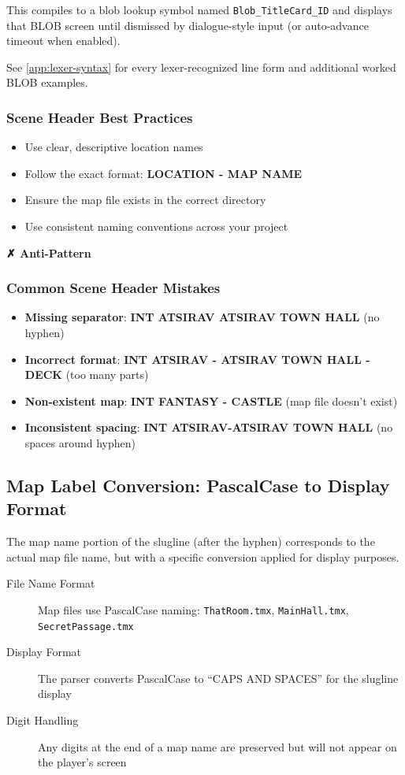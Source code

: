 \documentclass[11pt,letterpaper,oldstylefigures]{memoir}
\newenvironment{AntiPattern}
{\begingroup
\small
\setlength{\parindent}{0pt}
\setlength{\parskip}{0.5em}
\allowdisplaybreaks
\setlength{\displaywidowpenalty}{0}
\setlength{\widowpenalty}{0}
\setlength{\clubpenalty}{0}
\setlength{\interlinepenalty}{0}
\begin{tcolorbox}[
    colback=red!5,
    colframe=red!75!black,
    boxrule=0.5pt,
    arc=2pt,
    left=0.5em,
    right=0.5em,
    top=0.25em,
    bottom=0.25em
]
\textbf{✗ Anti-Pattern}
\end{tcolorbox}\par
}
{\endgroup}
\newcommand{\fountain}[1]{\textbf{#1}}
\begin{document}
This compiles to a blob lookup symbol named \texttt{Blob\_TitleCard\_ID} and displays that BLOB screen until dismissed by dialogue-style input (or auto-advance timeout when enabled).

\noindent See \autoref{app:lexer-syntax} for every lexer-recognized line form and additional worked BLOB examples.

\subsubsection{Scene Header Best Practices}
\begin{itemize}
\item Use clear, descriptive location names
\item Follow the exact format: \fountain{LOCATION - MAP NAME}
\item Ensure the map file exists in the correct directory
\item Use consistent naming conventions across your project
\end{itemize}


\begin{AntiPattern}
\subsubsection{Common Scene Header Mistakes}
\begin{itemize}
\item \textbf{Missing separator}: \fountain{INT ATSIRAV ATSIRAV TOWN HALL} (no hyphen)
\item \textbf{Incorrect format}: \fountain{INT ATSIRAV - ATSIRAV TOWN HALL - DECK} (too many parts)
\item \textbf{Non-existent map}: \fountain{INT FANTASY - CASTLE} (map file doesn't exist)
\item \textbf{Inconsistent spacing}: \fountain{INT ATSIRAV-ATSIRAV TOWN HALL} (no spaces around hyphen)
\end{itemize}
\end{AntiPattern}

\subsection{Map Label Conversion: PascalCase to Display Format}

The map name portion of the slugline (after the hyphen) corresponds to the actual map file name, but with a specific conversion applied for display purposes.

\begin{description}
\item[File Name Format] Map files use PascalCase naming: \texttt{ThatRoom.tmx}, \texttt{MainHall.tmx}, \texttt{SecretPassage.tmx}
\item[Display Format] The parser converts PascalCase to ``CAPS AND SPACES'' for the slugline display
\item[Digit Handling] Any digits at the end of a map name are preserved but will not appear on the player's screen
\end{description}
\end{document}
